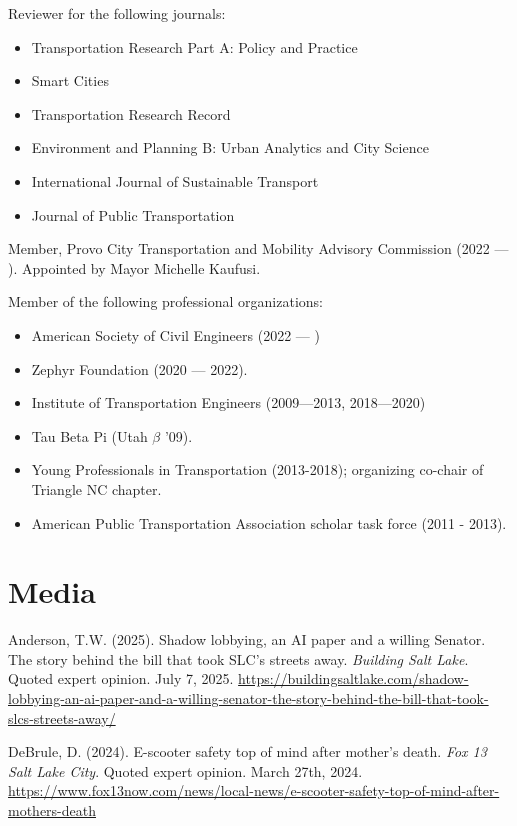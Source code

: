 \documentclass[margin,line]{res}
\begin{document}
\begin{resume}
Reviewer for the following journals:

\begin{itemize}
  \item Transportation Research Part A: Policy and Practice
  \item Smart Cities
  \item Transportation Research Record
  \item Environment and Planning B: Urban Analytics and City Science
  \item International Journal of Sustainable Transport
  \item Journal of Public Transportation
\end{itemize}

Member, Provo City Transportation and Mobility Advisory Commission (2022 --- ). Appointed by Mayor Michelle Kaufusi.

Member of the following professional organizations:

\begin{itemize}
  \item American Society of Civil Engineers (2022 --- )
  \item Zephyr Foundation (2020 --- 2022).
  \item Institute of Transportation Engineers (2009---2013, 2018---2020)
  \item Tau Beta Pi (Utah $\beta$ '09).
  \item Young Professionals in Transportation (2013-2018); organizing co-chair of
Triangle NC chapter.
  \item American Public Transportation Association scholar task force (2011 - 2013).
\end{itemize}


\section{Media}
Anderson, T.W. (2025). Shadow lobbying, an AI paper and a willing Senator. The story behind the bill that took SLC’s streets away. \textit{Building Salt Lake}. Quoted expert opinion. July 7, 2025. \url{https://buildingsaltlake.com/shadow-lobbying-an-ai-paper-and-a-willing-senator-the-story-behind-the-bill-that-took-slcs-streets-away/}

DeBrule, D. (2024). E-scooter safety top of mind after mother's death. \textit{Fox 13 Salt Lake City}. Quoted expert opinion. March 27th, 2024. \url{https://www.fox13now.com/news/local-news/e-scooter-safety-top-of-mind-after-mothers-death}


\end{resume}
\end{document}
